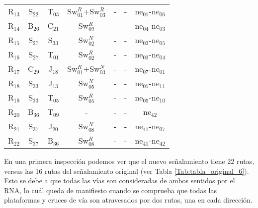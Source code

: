 \begin{table}[H]
{{\begin{tabular}{ c c c c c c c }
                    R$_{13}$  & S$_{22}$ & T$_{03}$ & Sw$_{01}^{R}$+Sw$_{03}^{R}$ & - & - & ne$_{01}$-ne$_{06}$\\
                    R$_{14}$  & B$_{26}$ & C$_{21}$ & Sw$_{02}^{R}$ & - & - & ne$_{04}$-ne$_{03}$\\
                    R$_{15}$  & S$_{27}$ & S$_{33}$ & Sw$_{02}^{N}$ & - & - & ne$_{03}$-ne$_{05}$\\
                    R$_{16}$  & S$_{27}$ & T$_{01}$ & Sw$_{02}^{R}$ & - & - & ne$_{03}$-ne$_{04}$\\
                    R$_{17}$  & C$_{29}$ & J$_{18}$ & Sw$_{01}^{R}$+Sw$_{03}^{N}$ & - & - & ne$_{07}$-ne$_{01}$\\
                    R$_{18}$  & S$_{33}$ & J$_{13}$ & Sw$_{05}^{N}$ & - & - & ne$_{05}$-ne$_{11}$\\
                    R$_{19}$  & S$_{33}$ & T$_{05}$ & Sw$_{05}^{R}$ & - & - & ne$_{05}$-ne$_{10}$\\
                    R$_{20}$  & B$_{36}$ & T$_{09}$ & - & - & - & ne$_{42}$\\
                    R$_{21}$  & S$_{37}$ & J$_{20}$ & Sw$_{08}^{N}$ & - & - & ne$_{41}$-ne$_{07}$\\
                    R$_{22}$  & S$_{37}$ & B$_{36}$ & Sw$_{08}^{R}$ & - & - & ne$_{41}$-ne$_{42}$\\
                \hline
            \end{tabular}
        }
     }
    \end{table}
    
    En una primera inspección podemos ver que el nuevo señalamiento tiene 22 rutas, versus las 16 rutas del señalamiento original (ver Tabla \ref{Tab:tabla_original_6}). Esto se debe a que todas las vías son consideradas de ambos sentidos por el RNA, lo cuál queda de manifiesto cuando se comprueba que todas las plataformas y cruces de vía son atravesados por dos rutas, una en cada dirección. 